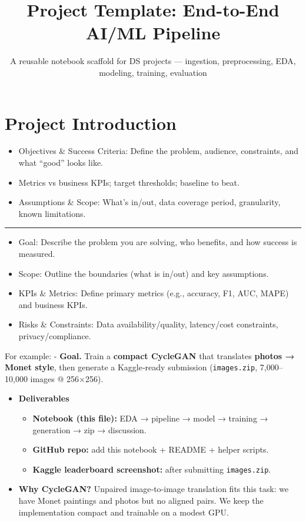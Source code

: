 \documentclass[
  letterpaper,
  DIV=11,
  numbers=noendperiod]{scrartcl}
\title{Project Template: End-to-End AI/ML Pipeline}
\subtitle{A reusable notebook scaffold for DS projects --- ingestion,
preprocessing, EDA, modeling, training, evaluation}
\author{}
\date{}
\providecommand{\tightlist}{%
  \setlength{\itemsep}{0pt}\setlength{\parskip}{0pt}}
\renewcommand*\contentsname{Table of contents}
\newcommand\contentsname{Table of contents}
\begin{document}
\maketitle

\renewcommand*\contentsname{Table of contents}
{
\hypersetup{linkcolor=}
\setcounter{tocdepth}{3}
\tableofcontents
}

\section{Project Introduction}\label{project-introduction}

\begin{itemize}
\tightlist
\item
  Objectives \& Success Criteria: Define the problem, audience,
  constraints, and what ``good'' looks like.
\item
  Metrics vs business KPIs; target thresholds; baseline to beat.
\item
  Assumptions \& Scope: What's in/out, data coverage period,
  granularity, known limitations.
\end{itemize}

\begin{center}\rule{0.5\linewidth}{0.5pt}\end{center}

\begin{itemize}
\tightlist
\item
  Goal: Describe the problem you are solving, who benefits, and how
  success is measured.
\item
  Scope: Outline the boundaries (what is in/out) and key assumptions.
\item
  KPIs \& Metrics: Define primary metrics (e.g., accuracy, F1, AUC,
  MAPE) and business KPIs.
\item
  Risks \& Constraints: Data availability/quality, latency/cost
  constraints, privacy/compliance.
\end{itemize}

For example: - \textbf{Goal.} Train a \textbf{compact CycleGAN} that
translates \textbf{photos → Monet style}, then generate a Kaggle‑ready
submission (\texttt{images.zip}, 7,000--10,000 images @ 256×256).

\begin{itemize}
\tightlist
\item
  \textbf{Deliverables}

  \begin{itemize}
  \tightlist
  \item
    \textbf{Notebook (this file):} EDA → pipeline → model → training →
    generation → zip → discussion.
  \item
    \textbf{GitHub repo:} add this notebook + README + helper scripts.
  \item
    \textbf{Kaggle leaderboard screenshot:} after submitting
    \texttt{images.zip}.
  \end{itemize}
\item
  \textbf{Why CycleGAN?} Unpaired image‑to‑image translation fits this
  task: we have Monet paintings and photos but no aligned pairs. We keep
  the implementation compact and trainable on a modest GPU.
\end{itemize}
\end{document}
